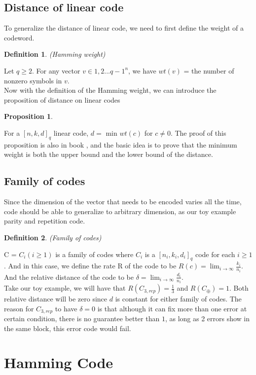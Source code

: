 \documentclass{article}
\newtheorem{Definition}{Definition}
\newtheorem{Proposition}{Proposition}
\begin{document}
\subsection{Distance of linear code}
To generalize the distance of linear code, we need to first define the weight of a codeword.
\begin{Definition}(Hamming weight)\end{Definition}
\noindent Let $q \ge 2$. For any vector $v \in {1,2...q-1}^n$, we have $wt(v)$ = the number of nonzero symbols in $v$.\\
Now with the definition of the Hamming weight, we can introduce the proposition of distance on linear codes
\begin{Proposition} \end{Proposition}
\noindent For a $[n,k,d]_q$ linear code, $d =$ min $wt(c)$ for $c \neq 0$. The proof of this proposition is also in book \cite{book}, and the basic idea is to prove that the minimum weight is both the upper bound and the lower bound of the distance.
\subsection{Family of codes}
Since the dimension of the vector that needs to be encoded varies all the time, code should be able to generalize to arbitrary dimension, as our toy example parity and repetition code.
\begin{Definition}(Family of codes)\end{Definition}
\noindent C = $C_i(i \ge 1)$ is a family of codes where $C_i$ is a $[n_i,k_i,d_i]_q$ code for each $i \ge 1$. And in this case, we define the rate R of the code to be $ R(c) = \lim_{i\to\infty} \frac{k_i}{n_i}$. And the relative distance of the code to be $\delta = \lim_{i\to\infty} \frac{d_i}{n_i}$.\\
Take our toy example, we will have that $R(C_{3,rep}) = \frac{1}{3}$ and $R(C_\oplus) = 1$. Both relative distance will be zero since $d$ is constant for either family of codes. The reason for $C_{3,rep}$ to have $\delta = 0$ is that although it can fix more than one error at certain condition, there is no guarantee better than $1$, as long as 2 errors show in the same block, this error code would fail.

\section{Hamming Code}
\end{document}
